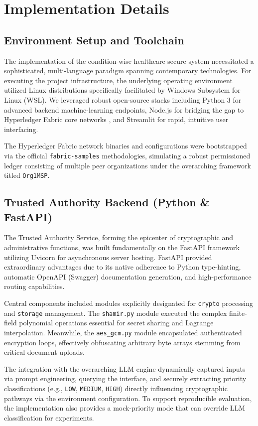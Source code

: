 \chapter{Implementation Details}

\section{Environment Setup and Toolchain}
The implementation of the condition-wise healthcare secure system necessitated a sophisticated, multi-language paradigm spanning contemporary technologies.
For executing the project infrastructure, the underlying operating environment utilized Linux distributions specifically facilitated by Windows Subsystem for Linux (WSL). We leveraged robust open-source stacks including Python 3 for advanced backend machine-learning endpoints, Node.js for bridging the gap to Hyperledger Fabric core networks \cite{seidi2025decentralized}, and Streamlit for rapid, intuitive user interfacing.

The Hyperledger Fabric network binaries and configurations were bootstrapped via the official \texttt{fabric-samples} methodologies, simulating a robust permissioned ledger consisting of multiple peer organizations under the overarching framework titled \texttt{Org1MSP}.

\section{Trusted Authority Backend (Python \& FastAPI)}
The Trusted Authority Service, forming the epicenter of cryptographic and administrative functions, was built fundamentally on the FastAPI framework utilizing Uvicorn for asynchronous server hosting. FastAPI provided extraordinary advantages due to its native adherence to Python type-hinting, automatic OpenAPI (Swagger) documentation generation, and high-performance routing capabilities.

Central components included modules explicitly designated for \texttt{crypto} processing and \texttt{storage} management. The \texttt{shamir.py} module executed the complex finite-field polynomial operations essential for secret sharing and Lagrange interpolation. Meanwhile, the \texttt{aes\_gcm.py} module encapsulated authenticated encryption loops, effectively obfuscating arbitrary byte arrays stemming from critical document uploads.

The integration with the overarching LLM engine dynamically captured inputs via prompt engineering, querying the interface, and securely extracting priority classifications (e.g., \texttt{LOW}, \texttt{MEDIUM}, \texttt{HIGH}) directly influencing cryptographic pathways via the environment configuration. To support reproducible evaluation, the implementation also provides a mock-priority mode that can override LLM classification for experiments.

